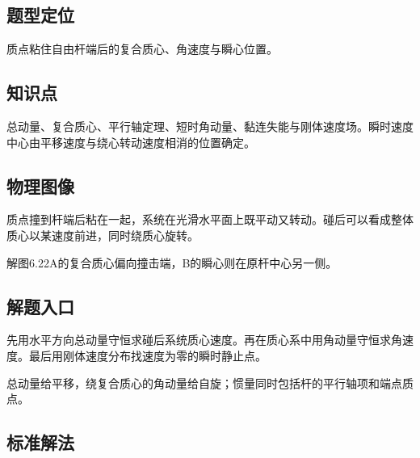 \documentclass[UTF8,fontset=fandol,a4paper,11pt]{ctexart}
\begin{document}


\subsection*{题型定位}

质点粘住自由杆端后的复合质心、角速度与瞬心位置。



\subsection*{知识点}

总动量、复合质心、平行轴定理、短时角动量、黏连失能与刚体速度场。瞬时速度中心由平移速度与绕心转动速度相消的位置确定。




\subsection*{物理图像}

质点撞到杆端后粘在一起，系统在光滑水平面上既平动又转动。碰后可以看成整体质心以某速度前进，同时绕质心旋转。

解图6.22A的复合质心偏向撞击端，B的瞬心则在原杆中心另一侧。



\subsection*{解题入口}

先用水平方向总动量守恒求碰后系统质心速度。再在质心系中用角动量守恒求角速度。最后用刚体速度分布找速度为零的瞬时静止点。

总动量给平移，绕复合质心的角动量给自旋；惯量同时包括杆的平行轴项和端点质点。



\subsection*{标准解法}
\end{document}
